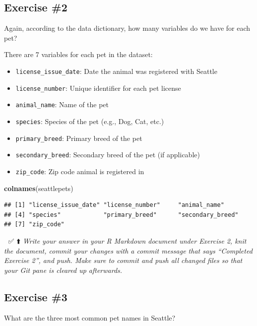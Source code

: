 \documentclass[
]{article}
\newenvironment{Shaded}{\begin{snugshade}}{\end{snugshade}}
\newcommand{\FunctionTok}[1]{\textcolor[rgb]{0.13,0.29,0.53}{\textbf{#1}}}
\newcommand{\NormalTok}[1]{#1}
\begin{document}
\subsection{Exercise \#2}\label{exercise-2}

Again, according to the data dictionary, how many variables do we have
for each pet?

There are 7 variables for each pet in the dataset:

\begin{itemize}
\item
  \texttt{license\_issue\_date}: Date the animal was registered with
  Seattle
\item
  \texttt{license\_number}: Unique identifier for each pet license
\item
  \texttt{animal\_name}: Name of the pet
\item
  \texttt{species}: Species of the pet (e.g., Dog, Cat, etc.)
\item
  \texttt{primary\_breed}: Primary breed of the pet
\item
  \texttt{secondary\_breed}: Secondary breed of the pet (if applicable)
\item
  \texttt{zip\_code}: Zip code animal is registered in
\end{itemize}

\begin{Shaded}
\begin{Highlighting}[]
\FunctionTok{colnames}\NormalTok{(seattlepets)}
\end{Highlighting}
\end{Shaded}

\begin{verbatim}
## [1] "license_issue_date" "license_number"     "animal_name"       
## [4] "species"            "primary_breed"      "secondary_breed"   
## [7] "zip_code"
\end{verbatim}

🧶 ✅ ⬆️ \emph{Write your answer in your R Markdown document under
Exercise 2, knit the document, commit your changes with a commit message
that says ``Completed Exercise 2'', and push. Make sure to commit and
push all changed files so that your Git pane is cleared up afterwards.}

\subsection{Exercise \#3}\label{exercise-3}

What are the three most common pet names in Seattle?
\end{document}
